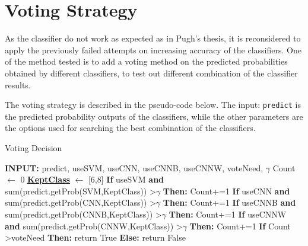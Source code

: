 \documentclass[bsc,logo,twoside,fullspacing,parskip]{infthesis}
\begin{document}



\section{Voting Strategy}
\label{sec:voting}

As the classifier do not work as expected as in Pugh's thesis, it is reconsidered to apply the previously failed attempts on increasing accuracy of the classifiers.
One of the method tested is to add a voting method on the predicted probabilities obtained by different classifiers, to test out different combination of the classifier results.

The voting strategy is described in the pseudo-code below. 
The input: {\tt predict} is the predicted probability outputs of the classifiers, while the other parameters are the options used for searching the best combination of the classifiers. 

\begin{algorithm}
\caption{Voting Decision}
\begin{algorithmic}
\STATE \textbf{INPUT:} predict, useSVM, useCNN, useCNNB, useCNNW, voteNeed, $\gamma$
\STATE Count $\leftarrow$ 0
\STATE \underline{\textbf{KeptClass}} $\leftarrow$ [6,8]
\STATE \textbf{If} useSVM \textbf{and} sum(predict.getProb(SVM,KeptClass)) \textgreater  $\gamma$ \textbf{ Then:} Count+=1
\STATE \textbf{If} useCNN \textbf{and} sum(predict.getProb(CNN,KeptClass)) \textgreater  $\gamma$ \textbf{ Then:} Count+=1
\STATE \textbf{If} useCNNB \textbf{and} sum(predict.getProb(CNNB,KeptClass)) \textgreater  $\gamma$ \textbf{ Then:} Count+=1
\STATE \textbf{If} useCNNW \textbf{and} sum(predict.getProb(CNNW,KeptClass)) \textgreater  $\gamma$ \textbf{ Then:} Count+=1
\STATE \textbf{If} Count \textgreater voteNeed \textbf{ Then:} return True \textbf{ Else:} return False
\end{algorithmic} 
\end{algorithm}
\end{document}
